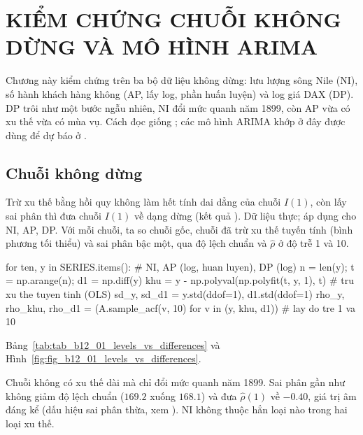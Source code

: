 \clearpage
\section[Kiểm chứng chuỗi không dừng và mô hình ARIMA]{KIỂM CHỨNG CHUỖI KHÔNG DỪNG VÀ MÔ HÌNH ARIMA}

Chương này kiểm chứng  trên ba bộ dữ liệu không dừng: lưu lượng sông Nile (NI), số hành khách hàng không (AP, lấy log, phần huấn luyện) và log giá DAX (DP). DP trôi như một bước ngẫu nhiên, NI đổi mức quanh năm 1899, còn AP vừa có xu thế vừa có mùa vụ. Cách đọc giống ; các mô hình ARIMA khớp ở đây được dùng để dự báo ở .

\subsection{Chuỗi không dừng}

 Trừ xu thế bằng hồi quy không làm hết tính dai dẳng của chuỗi $I(1)$, còn lấy sai phân thì đưa chuỗi $I(1)$ về dạng dừng (kết quả ).
 Dữ liệu thực; áp dụng cho NI, AP, DP. Với mỗi chuỗi, ta so chuỗi gốc, chuỗi đã trừ xu thế tuyến tính (bình phương tối thiểu) và sai phân bậc một, qua độ lệch chuẩn và $\hat\rho$ ở độ trễ 1 và 10.
\begin{codeblock}
for ten, y in SERIES.items():                      # NI, AP (log, huan luyen), DP (log)
    n = len(y); t = np.arange(n); d1 = np.diff(y)
    khu = y - np.polyval(np.polyfit(t, y, 1), t)             # tru xu the tuyen tinh (OLS)
    sd_y, sd_d1 = y.std(ddof=1), d1.std(ddof=1)
    rho_y, rho_khu, rho_d1 = (A.sample_acf(v, 10) for v in (y, khu, d1))   # lay do tre 1 va 10
\end{codeblock}
 Bảng~\ref{tab:tab_b12_01_levels_vs_differences} và Hình~\ref{fig:fig_b12_01_levels_vs_differences}.

 Chuỗi không có xu thế dài mà chỉ đổi mức quanh năm 1899. Sai phân gần như không giảm độ lệch chuẩn ($169.2$ xuống $168.1$) và đưa $\hat\rho(1)$ về $-0.40$, giá trị âm đáng kể (dấu hiệu sai phân thừa, xem ). NI không thuộc hẳn loại nào trong hai loại xu thế.

